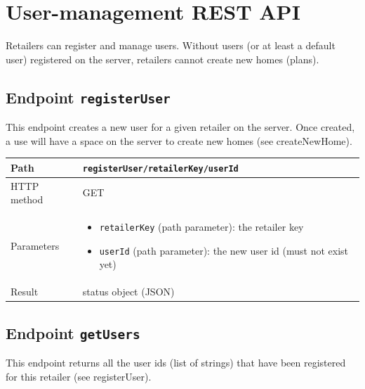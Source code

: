 \documentclass[a4paper]{report}
\begin{document}
\section{User-management REST API}

Retailers can register and manage users. Without users (or at least a default user) registered on the server, retailers cannot create new homes (plans).

\subsection{Endpoint \texttt{registerUser}}

This endpoint creates a new user for a given retailer on the server. Once created, a use will have a space on the server to create new homes (see createNewHome).

\begin{center}
\begin{tabularx} {\textwidth} { | l | X | }

\hline

Path & \texttt{registerUser/retailerKey/userId} \\

\hline

HTTP method & GET \\

\hline

Parameters & \begin{itemize}[leftmargin=*,noitemsep,topsep=0px]
\item \texttt{retailerKey} (path parameter): the retailer key
\item \texttt{userId} (path parameter): the new user id (must not exist yet) 
\end{itemize} \\

\hline

Result & status object (JSON) \\

\hline

\end{tabularx}
\end{center}

\subsection{Endpoint \texttt{getUsers}}

This endpoint returns all the user ids (list of strings) that have been registered for this retailer (see registerUser).
\end{document}
